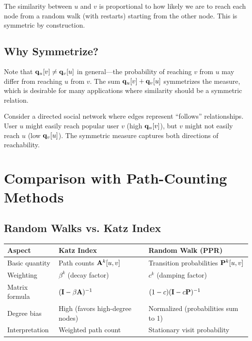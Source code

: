 \begin{notechapter}
\begin{intuition}
The similarity between $u$ and $v$ is proportional to how likely we are to reach each node from a random walk (with restarts) starting from the other node. This is symmetric by construction.
\end{intuition}

\subsection{Why Symmetrize?}

Note that $\mathbf{q}_u[v] \neq \mathbf{q}_v[u]$ in general---the probability of reaching $v$ from $u$ may differ from reaching $u$ from $v$. The sum $\mathbf{q}_u[v] + \mathbf{q}_v[u]$ symmetrizes the measure, which is desirable for many applications where similarity should be a symmetric relation.

\begin{example}
Consider a directed social network where edges represent ``follows'' relationships. User $u$ might easily reach popular user $v$ (high $\mathbf{q}_u[v]$), but $v$ might not easily reach $u$ (low $\mathbf{q}_v[u]$). The symmetric measure captures both directions of reachability.
\end{example}

\section{Comparison with Path-Counting Methods}

\subsection{Random Walks vs. Katz Index}

\begin{center}
\begin{tabular}{lll}
\toprule
\textbf{Aspect} & \textbf{Katz Index} & \textbf{Random Walk (PPR)} \\
\midrule
Basic quantity & Path counts $\mathbf{A}^k[u,v]$ & Transition probabilities $\mathbf{P}^k[u,v]$ \\
Weighting & $\beta^k$ (decay factor) & $c^k$ (damping factor) \\
Matrix formula & $(\mathbf{I} - \beta\mathbf{A})^{-1}$ & $(1-c)(\mathbf{I} - c\mathbf{P})^{-1}$ \\
Degree bias & High (favors high-degree nodes) & Normalized (probabilities sum to 1) \\
Interpretation & Weighted path count & Stationary visit probability \\
\bottomrule
\end{tabular}
\end{center}


\end{notechapter}
